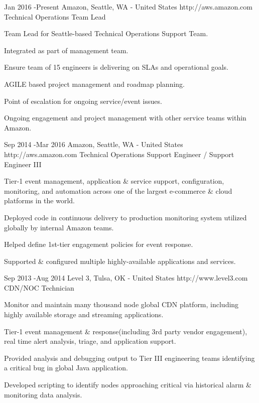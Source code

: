 \documentclass[10pt]{article} %
\begin{document}
\job
{Jan 2016 -}{Present}
{Amazon, Seattle, WA - United States}
{http://aws.amazon.com}
{Technical Operations Team Lead}
{
\begin{itemize-noindent}
\item{Team Lead for Seattle-based Technical Operations Support Team.}
\item{Integrated as part of management team.}
\item{Ensure team of 15 engineers is delivering on SLAs and operational goals.}
\item{AGILE based project management and roadmap planning.}
\item{Point of escalation for ongoing service/event issues.}
\item{Ongoing engagement and project management with other service teams within Amazon.}
\end{itemize-noindent}

}
	
\job
{Sep 2014 -}{Mar 2016}
{Amazon, Seattle, WA - United States}
{http://aws.amazon.com}
{Technical Operations Support Engineer / Support Engineer III}
{
\begin{itemize-noindent}
\item{Tier-1 event management, application \& service support, configuration, monitoring, and automation across one of the largest e-commerce \& cloud platforms in the world.}
\item{Deployed code in continuous delivery to production monitoring system utilized globally by internal Amazon teams.}
\item{Helped define 1st-tier engagement policies for event response.}
\item{Supported \& configured multiple highly-available applications and services.}
\end{itemize-noindent}

}



\job
{Sep 2013 -}{Aug 2014}
{Level 3, Tulsa, OK - United States}
{http://www.level3.com}
{CDN/NOC Technician}
{
\begin{itemize-noindent}
\item{Monitor and maintain many thousand node global CDN platform, including highly available storage and streaming applications.}
\item{Tier-1 event management \& response(including 3rd party vendor engagement), real time alert analysis, triage, and application support.}
\item{Provided analysis and debugging output to Tier III engineering teams identifying a critical bug in global Java application.}
\item{Developed scripting to identify nodes approaching critical via historical alarm \& monitoring data analysis.}
\end{itemize-noindent}
}
\end{document}
